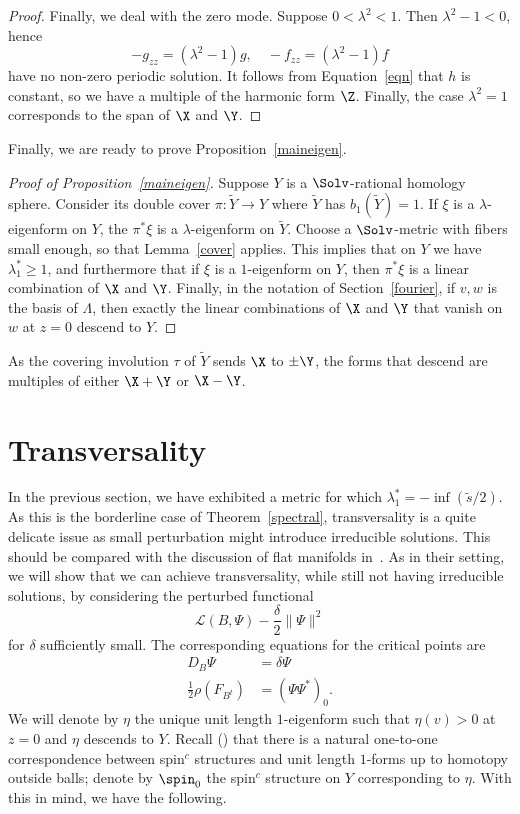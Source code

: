 \begin{proof}
Finally, we deal with the zero mode. Suppose $0<\lambda^2< 1$. Then $\lambda^2-1<0$, hence
\[
-g_{zz}=\left(\lambda^2-1\right)g,\quad -f_{zz}=\left(\lambda^2-1\right)f
\]
have no non-zero periodic solution. It follows from Equation~\eqref{eqn} that $h$ is constant, so we have a multiple of the harmonic form $\Z$. Finally, the case $\lambda^2=1$ corresponds to the span of $\X$ and $\Y$.
\end{proof}

Finally, we are ready to prove Proposition~\ref{maineigen}.
\begin{proof}[Proof of Proposition~\ref{maineigen}]
Suppose $Y$ is a $\Solv$-rational homology sphere. Consider its double cover $\pi:\tilde{Y}\rightarrow Y$ where $\tilde{Y}$ has $b_1(\tilde{Y})=1$. If $\xi$ is a $\lambda$-eigenform on $Y$, the $\pi^*\xi$ is a $\lambda$-eigenform on $\tilde{Y}$. Choose a $\Solv$-metric with fibers small enough, so that Lemma~\ref{cover} applies. This implies that on $Y$ we have $\lambda_1^*\geq1$, and furthermore that if $\xi$ is a $1$-eigenform on $Y$, then $\pi^*\xi$ is a linear combination of $\X$ and $\Y$. Finally, in the notation of Section~\ref{fourier}, if $v,w$ is the basis of $\Lambda$, then exactly the linear combinations of $\X$ and $\Y$ that vanish on $w$ at $z=0$ descend to $Y$.
\end{proof}


\begin{rema}
As the covering involution $\tau$ of $\tilde{Y}$ sends $\X$ to $\pm \Y$, the forms that descend are multiples of either $\X+\Y$ or $\X-\Y$.
\end{rema}


\section{Transversality}\label{trans}
In the previous section, we have exhibited a metric for which $\lambda_1^*=-\inf (\tilde{s}/2)$. As this is the borderline case of Theorem~\ref{spectral}, transversality is a quite delicate issue as small perturbation might introduce irreducible solutions. This should be compared with the discussion of flat manifolds in~\cite[Chapter~37]{KM}. As in their setting, we will show that we can achieve transversality, while still not having irreducible solutions, by considering the perturbed functional
\[
\mathcal{L}(B,\Psi)-\frac{\delta}{2}\|\Psi\|^2
\]
for $\delta$ sufficiently small. The corresponding equations for the critical points are
\begin{align*}
D_B\Psi&=\delta\Psi\\
\frac{1}{2}\rho(F_{B^t})&=(\Psi\Psi^*)_0.
\end{align*}
We will denote by $\eta$ the unique unit length $1$-eigenform such that $\eta(v)>0$ at $z=0$ and $\eta$ descends to $Y$. Recall (\cite[Lemma~1.4]{Tur}) that there is a natural one-to-one correspondence between spin$^c$ structures and unit length $1$-forms up to homotopy outside balls; denote by $\spin_0$ the spin$^c$ structure on $Y$ corresponding to $\eta$. With this in mind, we have the following.


